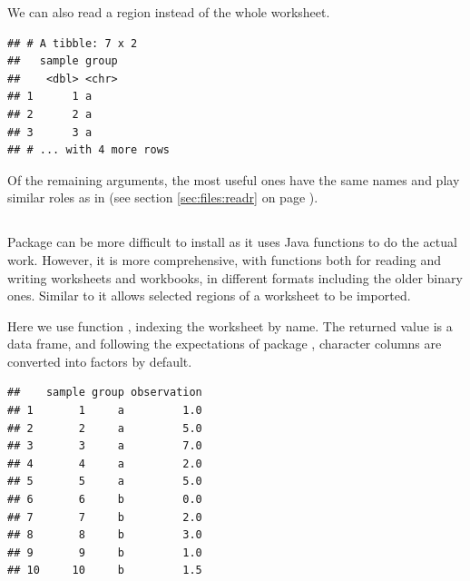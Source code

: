 \documentclass[krantz2]{krantz}\usepackage{knitr}
\begin{document}
We can also read a region instead of the whole worksheet.

\begin{knitrout}\footnotesize
{}\color{fgcolor}\begin{kframe}
\begin{alltt}
 \hlkwb{<-} \hlstd{(}\hlstd{,}  \hlstd{=} \hlstd{,}  \hlstd{=} \hlstd{)}
\end{alltt}
\begin{verbatim}
## # A tibble: 7 x 2
##   sample group
##    <dbl> <chr>
## 1      1 a
## 2      2 a
## 3      3 a
## # ... with 4 more rows
\end{verbatim}
\end{kframe}
\end{knitrout}

Of the remaining arguments, the most useful ones have the same names and play similar roles as in  (see section \ref{sec:files:readr} on page \pageref{sec:files:readr}).

\subsection[`xlsx']{}



Package  can be more difficult to install as it uses Java functions to do the actual work. However, it is more comprehensive, with functions both for reading and writing  worksheets and workbooks, in different formats including the older binary ones. Similar to  it allows selected regions of a worksheet to be imported.

Here we use function , indexing the worksheet by name. The returned value is a data frame, and following the expectations of \Rlang package , character columns are converted into factors by default.

\begin{knitrout}\footnotesize
{}\color{fgcolor}\begin{kframe}
\begin{alltt}
 \hlkwb{<-} \hlstd{(}\hlstd{,}  \hlstd{=} \hlstd{)}
\end{alltt}
\begin{verbatim}
##    sample group observation
## 1       1     a         1.0
## 2       2     a         5.0
## 3       3     a         7.0
## 4       4     a         2.0
## 5       5     a         5.0
## 6       6     b         0.0
## 7       7     b         2.0
## 8       8     b         3.0
## 9       9     b         1.0
## 10     10     b         1.5
\end{verbatim}
\end{kframe}
\end{knitrout}
\end{document}
